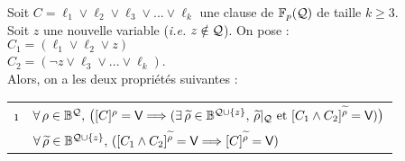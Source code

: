 		\begin{Proposition}
			Soit \(C = \ell_1 \vee \ell_2 \vee \ell_3 \vee ... \vee \ell_k\) une clause de \(\FpQ\) de taille \(k \geq 3\). \\
			Soit \(z\) une nouvelle variable (\emph{i.e.} \(z \notin \cal{Q}\)). On pose : \\ \hspace*{5mm} \bdot \(C_1 = (\ell_1 \vee \ell_2 \vee z)\) \\
			\hspace*{5mm} \bdot \(C_2 = (\neg z \vee \ell_3 \vee ... \vee \ell_k)\). \\[2mm]
			Alors, on a les deux propriétés suivantes : \\
				 \begin{tabular}[h]{cl}
				\i & \(\forall \, \rho \in \bb{B}^\cal{Q}, \, \big(\itp{C}{\rho} = \V \Longrightarrow (\exists \, \widetilde{\rho} \in \bb{B}^{\cal{Q} \cup \{z\}}, \, \widetilde{\rho}|_\cal{Q} \text{ et } \itp{C_1 \wedge C_2}{\widetilde{\rho}} = \V)\big)\) \\
				\ii & \(\forall \, \widetilde{\rho} \in \bb{B}^{\cal{Q} \cup \{z\}}, \, (\itp{C_1 \wedge C_2}{\widetilde{\rho}} = \V \Longrightarrow \itp{C}{\widetilde{\rho}} = \V)\)
				\end{tabular}
		\end{Proposition}
		
